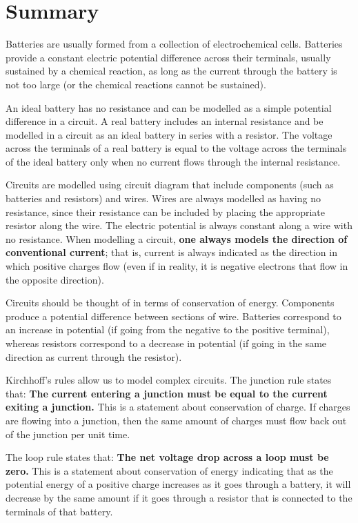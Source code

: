 \section{Summary}
\bigskip
\vspace{-1cm}
\bigskip
\begin{chapterSummary}
Batteries are usually formed from a collection of electrochemical cells. Batteries provide a constant electric potential difference across their terminals, usually sustained by a chemical reaction, as long as the current through the battery is not too large (or the chemical reactions cannot be sustained). 

An ideal battery has no resistance and can be modelled as a simple potential difference in a circuit. A real battery includes an internal resistance and be modelled in a circuit as an ideal battery in series with a resistor. The voltage across the terminals of a real battery is equal to the voltage across the terminals of the ideal battery only when no current flows through the internal resistance. 

Circuits are modelled using circuit diagram that include components (such as batteries and resistors) and wires. Wires are always modelled as having no resistance, since their resistance can be included by placing the appropriate resistor along the wire. The electric potential is always constant along a wire with no resistance. When modelling a circuit, \textbf{one always models the direction of conventional current}; that is, current is always indicated as the direction in which positive charges flow (even if in reality, it is negative electrons that flow in the opposite direction).

Circuits should be thought of in terms of conservation of energy. Components produce a potential difference between sections of wire. Batteries correspond to an increase in potential (if going from the negative to the positive terminal), whereas resistors correspond to a decrease in potential (if going in the same direction as current through the resistor). 

Kirchhoff's rules allow us to model complex circuits. The junction rule states that: \textbf{The current entering a junction must be equal to the current exiting a junction.} This is a statement about conservation of charge. If charges are flowing into a junction, then the same amount of charges must flow back out of the junction per unit time.

The loop rule states that: \textbf{The net voltage drop across a loop must be zero.} This is a statement about conservation of energy indicating that as the potential energy of a positive charge increases as it goes through a battery, it will decrease by the same amount if it goes through a resistor that is connected to the terminals of that battery.


\end{chapterSummary}
